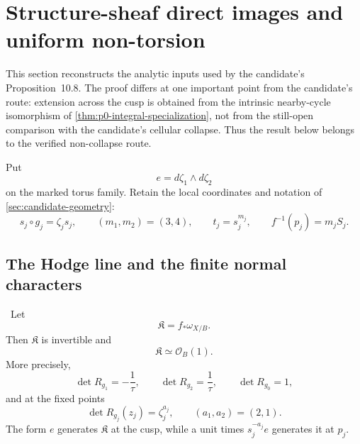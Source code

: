 \section{Structure-sheaf direct images and uniform non-torsion}
\label{sec:analytic-picard}

This section reconstructs the analytic inputs used by the candidate's
Proposition~10.8.  The proof differs at one important point from the
candidate's route: extension across the cusp is obtained from the intrinsic
nearby-cycle isomorphism of \cref{thm:p0-integral-specialization}, not from
the still-open comparison with the candidate's cellular collapse.  Thus the
result below belongs to the verified non-collapse route.

Put
\[
 e=d\zeta _1\wedge d\zeta _2
\]
on the marked torus family.  Retain the local coordinates and notation of
\cref{sec:candidate-geometry}:
\[
s_j\circ g_j=\zeta_js_j,\qquad
(m_1,m_2)=(3,4),\qquad t_j=s_j^{m_j},\qquad
f^{-1}(p_j)=m_jS_j.
\]

\subsection{The Hodge line and the finite normal characters}

\begin{lemma}
\label{lem:hodge-line-audit}
\Verified\ Let
\[
 \mathfrak K=f_*\omega_{X/B}.
\]
Then \(\mathfrak K\) is invertible and
\[
 \mathfrak K\simeq\mathcal O_B(1).
\tag{9.1}
\]
More precisely,
\[
 \det R_{g_1}=-\frac1\tau,\qquad
 \det R_{g_2}=\frac1\tau,\qquad
 \det R_{g_0}=1,
\tag{9.2}
\]
and at the fixed points
\[
 \det R_{g_j}(z_j)=\zeta_j^{a_j},
 \qquad (a_1,a_2)=(2,1).
\tag{9.3}
\]
The form \(e\) generates \(\mathfrak K\) at the cusp, while a unit times
\(s_j^{-a_j}e\) generates it at \(p_j\).
\end{lemma}

